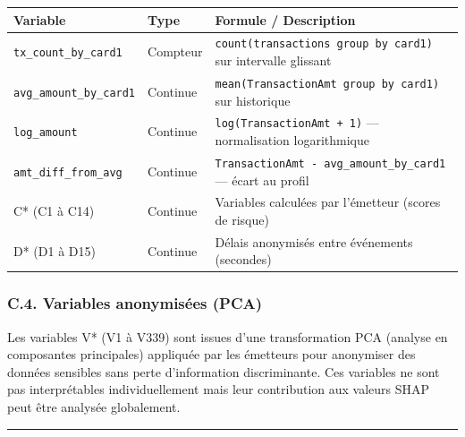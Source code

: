 \documentclass[
  12pt,
]{article}
\newcounter{none} %
\begin{document}
{\def\LTcaptype{none} %
\begin{longtable}[]{@{}
  >{\raggedright\arraybackslash}p{}
  >{\raggedright\arraybackslash}p{}
  >{\raggedright\arraybackslash}p{}@{}}
\toprule\noalign{}
\begin{minipage}[b]{\linewidth}\raggedright
Variable
\end{minipage} & \begin{minipage}[b]{\linewidth}\raggedright
Type
\end{minipage} & \begin{minipage}[b]{\linewidth}\raggedright
Formule / Description
\end{minipage} \\
\midrule\noalign{}
\endhead
\bottomrule\noalign{}
\endlastfoot
\texttt{tx\_count\_by\_card1} & Compteur &
\texttt{count(transactions\ group\ by\ card1)} sur intervalle
glissant \\
\texttt{avg\_amount\_by\_card1} & Continue &
\texttt{mean(TransactionAmt\ group\ by\ card1)} sur historique \\
\texttt{log\_amount} & Continue & \texttt{log(TransactionAmt\ +\ 1)} —
normalisation logarithmique \\
\texttt{amt\_diff\_from\_avg} & Continue &
\texttt{TransactionAmt\ -\ avg\_amount\_by\_card1} — écart au profil \\
C* (C1 à C14) & Continue & Variables calculées par l’émetteur (scores de
risque) \\
D* (D1 à D15) & Continue & Délais anonymisés entre événements
(secondes) \\
\end{longtable}
}

\subsubsection{C.4. Variables anonymisées
(PCA)}\label{c.4.-variables-anonymisuxe9es-pca}

Les variables V* (V1 à V339) sont issues d’une transformation PCA
(analyse en composantes principales) appliquée par les émetteurs pour
anonymiser des données sensibles sans perte d’information discriminante.
Ces variables ne sont pas interprétables individuellement mais leur
contribution aux valeurs SHAP peut être analysée globalement.

\begin{center}\rule{0.5\linewidth}{0.5pt}\end{center}
\end{document}
